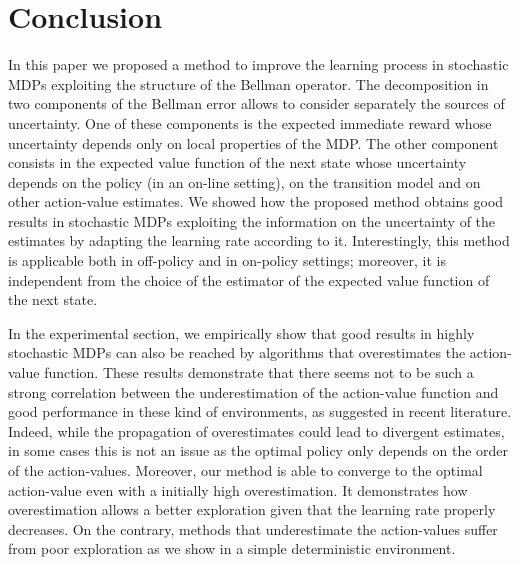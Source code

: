 \documentclass[conference]{IEEEtran}
\begin{document}
\section{Conclusion}
In this paper we proposed a method to improve the learning process in stochastic MDPs exploiting the structure of the Bellman operator. The decomposition in two components of the Bellman error allows to consider separately the sources of uncertainty. One of these components is the expected immediate reward whose uncertainty depends only on local properties of the MDP. The other component consists in the expected value function of the next state whose uncertainty depends on the policy (in an on-line setting), on the transition model and on other action-value estimates. We showed how the proposed method obtains good results in stochastic MDPs exploiting the information on the uncertainty of the estimates by adapting the learning rate according to it. Interestingly, this method is applicable both in off-policy and in on-policy settings; moreover, it is independent from the choice of the estimator of the expected value function of the next state.

In the experimental section, we empirically show that good results in highly stochastic MDPs can also be reached by algorithms that overestimates the action-value function. These results demonstrate that there seems not to be such a strong correlation between the underestimation of the action-value function and good performance in these kind of environments, as suggested in recent literature. Indeed, while the propagation of overestimates could lead to divergent estimates, in some cases this is not an issue as the optimal policy only depends on the order of the action-values. Moreover, our method is able to converge to the optimal action-value even with a initially high overestimation. It demonstrates how overestimation allows a better exploration given that the learning rate properly decreases. On the contrary, methods that underestimate the action-values suffer from poor exploration as we show in a simple deterministic environment.








\end{document}
